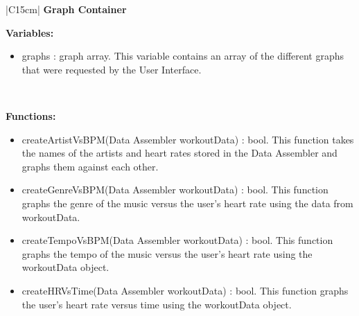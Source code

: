 \begin{center}
    \begin{tabular}{|C{15cm}|}
        \hline
            \textbf{Graph Container} \\
        \hline
            \begin{flushleft}
                \textbf{Variables:} \\
            \end{flushleft}
                \begin{itemize}
                    \item graphs : graph array. This variable contains an array of the different graphs that were requested by the User Interface.
                \end{itemize} \\
            \hline
            \begin{flushleft}
                \textbf{Functions: } \\
            \end{flushleft}
                \begin{itemize}
                    \item createArtistVsBPM(Data Assembler workoutData) : bool. This function takes the names of the artists and heart rates stored in the Data Assembler and graphs them against each other.
                    \item createGenreVsBPM(Data Assembler workoutData) : bool. This function graphs the genre of the music versus the user's heart rate using the data from workoutData.
                    \item createTempoVsBPM(Data Assembler workoutData) : bool. This function graphs the tempo of the music versus the user's heart rate using the workoutData object.
                    \item createHRVsTime(Data Assembler workoutData) : bool. This function graphs the user's heart rate versus time using the workoutData object.
                \end{itemize}
                \\
            \hline
    \end{tabular}
\end{center}

